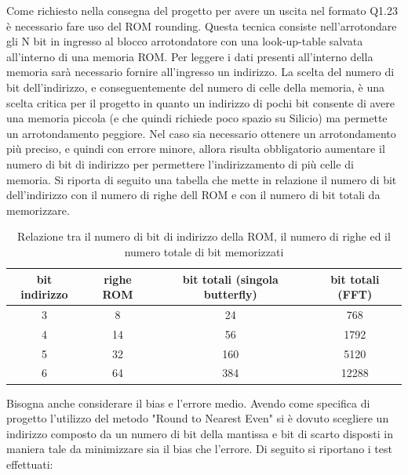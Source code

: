\noindent Come richiesto nella consegna del progetto per avere un uscita nel formato Q1.23 è necessario fare uso del ROM rounding.
Questa tecnica consiste nell'arrotondare gli N bit in ingresso al blocco arrotondatore con una look-up-table salvata all'interno
di una memoria ROM.
Per leggere i dati presenti all'interno della memoria sarà necessario fornire all'ingresso un indirizzo.
La scelta del numero di bit dell'indirizzo, e conseguentemente del numero di celle della memoria, è una scelta critica per il
progetto in quanto un indirizzo di pochi bit consente di avere una memoria piccola (e che quindi richiede poco spazio su Silicio)
ma permette un arrotondamento peggiore.
Nel caso sia necessario ottenere un arrotondamento più preciso, e quindi con errore minore, allora risulta obbligatorio aumentare
il numero di bit di indirizzo per permettere l'indirizzamento di più celle di memoria.
Si riporta di seguito una tabella che mette in relazione il numero di bit dell'indirizzo con il numero di righe dell ROM e con il
numero di bit totali da memorizzare.

\begin{table}[h!]
    \centering
    \begin{tabular}{|c|c|c|c|}
        \hline
        bit indirizzo  & righe ROM & bit totali (singola butterfly) & bit totali (FFT)   \\ \hline
            3          &     8     &            24                  &       768             \\ \hline
            4          &    14     &            56                  &       1792             \\ \hline
            5          &    32     &            160                 &       5120             \\ \hline
            6          &    64     &            384                 &      12288              \\ \hline
    \end{tabular}
    \caption{Relazione tra il numero di bit di indirizzo della ROM, il numero di righe ed il numero totale di bit memorizzati}
    \label{tab: indirizzo_righe_bit}
\end{table}

\noindent Bisogna anche considerare il bias e l'errore medio.
Avendo come specifica di progetto l'utilizzo del metodo "Round to Nearest Even" si è dovuto scegliere un indirizzo composto da un
numero di bit della mantissa e bit di scarto disposti in maniera tale da minimizzare sia il bias che l'errore.
Di seguito si riportano i test effettuati:

